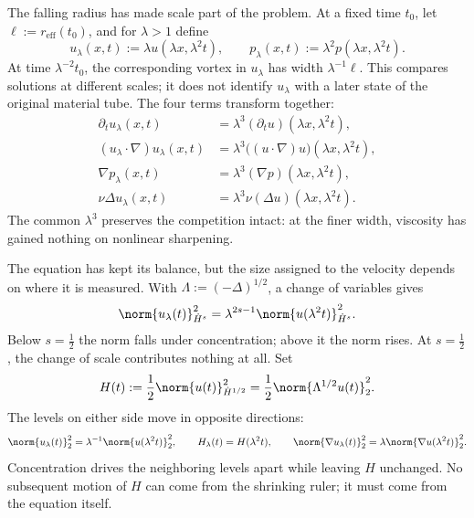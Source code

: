 
The falling radius has made scale part of the problem.
At a fixed time \(t_0\), let \(\ell:=r_{\mathrm{eff}}(t_0)\), and for \(\lambda>1\) define
\[
  u_\lambda(x,t)
  :=
  \lambda u(\lambda x,\lambda^2t),
  \qquad
  p_\lambda(x,t)
  :=
  \lambda^2p(\lambda x,\lambda^2t).
\]
At time \(\lambda^{-2}t_0\), the corresponding vortex in \(u_\lambda\) has width \(\lambda^{-1}\ell\).
This compares solutions at different scales; it does not identify \(u_\lambda\) with a later state of the original material tube.
The four terms transform together:
\[
\begin{aligned}
  \partial_tu_\lambda(x,t)
  &=
  \lambda^3(\partial_tu)(\lambda x,\lambda^2t),
  \\
  (u_\lambda\cdot\nabla)u_\lambda(x,t)
  &=
  \lambda^3\bigl((u\cdot\nabla)u\bigr)(\lambda x,\lambda^2t),
  \\
  \nabla p_\lambda(x,t)
  &=
  \lambda^3(\nabla p)(\lambda x,\lambda^2t),
  \\
  \nu\Delta u_\lambda(x,t)
  &=
  \lambda^3\nu(\Delta u)(\lambda x,\lambda^2t).
\end{aligned}
\]
The common \(\lambda^3\) preserves the competition intact: at the finer width, viscosity has gained nothing on nonlinear sharpening.


The equation has kept its balance, but the size assigned to the velocity depends on where it is measured.
With \(\Lambda:=(-\Delta)^{1/2}\), a change of variables gives
\[
  \norm{u_\lambda(t)}_{\dot H^s}^2
  =
  \lambda^{2s-1}
  \norm{u(\lambda^2t)}_{\dot H^s}^2.
\]
Below \(s=\tfrac12\) the norm falls under concentration; above it the norm rises.
At \(s=\tfrac12\), the change of scale contributes nothing at all.
Set
\[
  H(t)
  :=
  \frac12\norm{u(t)}_{\dot H^{1/2}}^2
  =
  \frac12\norm{\Lambda^{1/2}u(t)}_2^2.
\]
The levels on either side move in opposite directions:
\[
  \norm{u_\lambda(t)}_2^2
  =
  \lambda^{-1}\norm{u(\lambda^2t)}_2^2,
  \qquad
  H_\lambda(t)=H(\lambda^2t),
  \qquad
  \norm{\nabla u_\lambda(t)}_2^2
  =
  \lambda\norm{\nabla u(\lambda^2t)}_2^2.
\]
Concentration drives the neighboring levels apart while leaving \(H\) unchanged.
No subsequent motion of \(H\) can come from the shrinking ruler; it must come from the equation itself.


